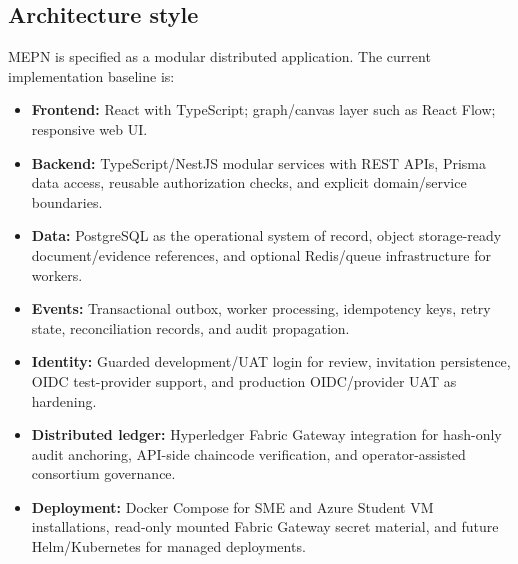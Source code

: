 \documentclass[11pt,a4paper]{article}
\newcommand{\systemshort}{MEPN}
\begin{document}
\subsection{Architecture style}
\systemshort{} is specified as a modular distributed application. The current implementation baseline is:
\begin{itemize}
  \item \textbf{Frontend:} React with TypeScript; graph/canvas layer such as React Flow; responsive web UI.
  \item \textbf{Backend:} TypeScript/NestJS modular services with REST APIs, Prisma data access, reusable authorization checks, and explicit domain/service boundaries.
  \item \textbf{Data:} PostgreSQL as the operational system of record, object storage-ready document/evidence references, and optional Redis/queue infrastructure for workers.
  \item \textbf{Events:} Transactional outbox, worker processing, idempotency keys, retry state, reconciliation records, and audit propagation.
  \item \textbf{Identity:} Guarded development/UAT login for review, invitation persistence, OIDC test-provider support, and production OIDC/provider UAT as hardening.
  \item \textbf{Distributed ledger:} Hyperledger Fabric Gateway integration for hash-only audit anchoring, API-side chaincode verification, and operator-assisted consortium governance.
  \item \textbf{Deployment:} Docker Compose for SME and Azure Student VM installations, read-only mounted Fabric Gateway secret material, and future Helm/Kubernetes for managed deployments.
\end{itemize}
\end{document}
